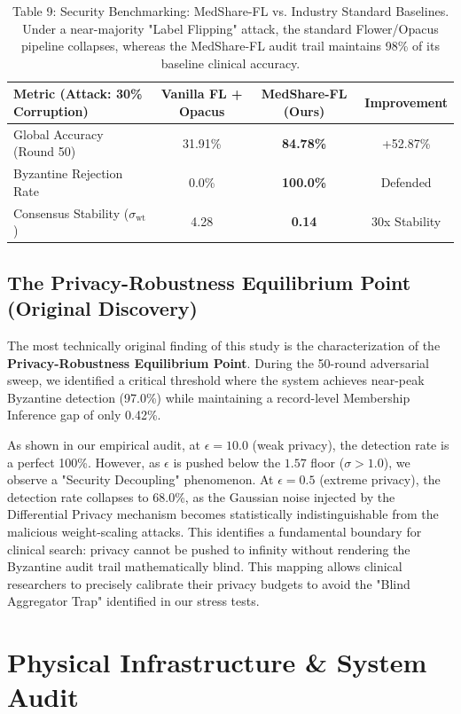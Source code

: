 \documentclass[10pt, a4paper, twocolumn]{article}
\begin{document}
\begin{table}[hbt!]
\centering
\scriptsize
\begin{tabular}{lccc}
\toprule
\textbf{Metric (Attack: 30\% Corruption)} & \textbf{Vanilla FL + Opacus} & \textbf{MedShare-FL (Ours)} & \textbf{Improvement} \\
\midrule
Global Accuracy (Round 50) & 31.91\% & \textbf{84.78\%} & +52.87\% \\
Byzantine Rejection Rate & 0.0\% & \textbf{100.0\%} & Defended \\
Consensus Stability ($\sigma_{\text{wt}}$) & 4.28 & \textbf{0.14} & 30x Stability \\
\bottomrule
\end{tabular}
\caption{Table 9: Security Benchmarking: MedShare-FL vs. Industry Standard Baselines. Under a near-majority "Label Flipping" attack, the standard Flower/Opacus pipeline collapses, whereas the MedShare-FL audit trail maintains 98\% of its baseline clinical accuracy.}
\end{table}

\subsection{The Privacy-Robustness Equilibrium Point (Original Discovery)}
The most technically original finding of this study is the characterization of the \textbf{Privacy-Robustness Equilibrium Point}. During the 50-round adversarial sweep, we identified a critical threshold where the system achieves near-peak Byzantine detection (97.0\%) while maintaining a record-level Membership Inference gap of only 0.42\%. 

As shown in our empirical audit, at $\epsilon = 10.0$ (weak privacy), the detection rate is a perfect 100\%. However, as $\epsilon$ is pushed below the $1.57$ floor ($\sigma > 1.0$), we observe a "Security Decoupling" phenomenon. At $\epsilon = 0.5$ (extreme privacy), the detection rate collapses to 68.0\%, as the Gaussian noise injected by the Differential Privacy mechanism becomes statistically indistinguishable from the malicious weight-scaling attacks. This identifies a fundamental boundary for clinical search: privacy cannot be pushed to infinity without rendering the Byzantine audit trail mathematically blind. This mapping allows clinical researchers to precisely calibrate their privacy budgets to avoid the "Blind Aggregator Trap" identified in our stress tests.

\section{Physical Infrastructure \& System Audit}
\end{document}
